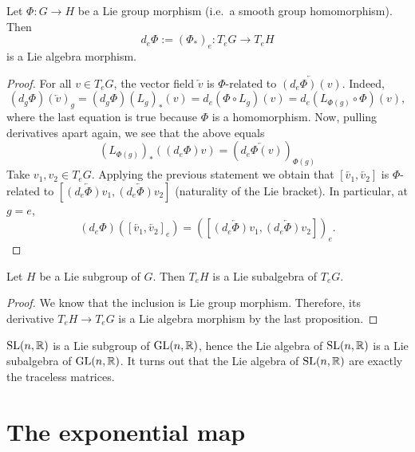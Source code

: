 \begin{prop}[B]\label{prop:B}
    Let $\Phi: G \to H$ be a Lie group morphism (i.e.\ a smooth group homomorphism).
    Then $$ d_e \Phi := (\Phi_*)_e: T_e G \to  T_e H $$ is a Lie algebra morphism.
\end{prop}
\begin{proof}
    For all $v \in T_eG$, the vector field $\overleftarrow v$ is  $\Phi$-related to 
    $\overleftarrow{( d_e \Phi)(v)}$.
    Indeed, 
    \[
        (d_g \Phi)(\overleftarrow v)_g = 
        (d_g \Phi)(L_g)_*(v) = 
        d_e (\Phi  \circ  L_g)(v) = 
        d_e(L_{\Phi(g)}  \circ  \Phi) (v)
    ,\] 
    where the last equation is true because $\Phi$ is a homomorphism.
    Now, pulling derivatives apart again, we see that the above equals
    \[
        (L_{\Phi(g)})_* ((d_e \Phi)v) = (\overleftarrow{d_e \Phi(v)})_{\Phi(g)}
    \] 
Take $v_1, v_2 \in T_e G$.
    Applying the previous statement we obtain that $ [\overleftarrow{v_1}, \overleftarrow{v_2}] $   is $\Phi$-related to $[\overleftarrow{(d_e \Phi)v_1}, \overleftarrow{(d_e \Phi)v_2}]$ (naturality of the Lie bracket).
    In particular, at  $g = e$,
     \[
         ( d_e \Phi)(\left[\overleftarrow{v_1}, \overleftarrow{v_2}\right]_e)
         = \left( \left[\overleftarrow{(d_e \Phi) v_1}, \overleftarrow{(d_e \Phi) v_2}\right] \right)_e
    .\] 
\end{proof}
\begin{prop}[C]
    Let $H$ be a Lie subgroup of $G$.
    Then $T_e H$ is a Lie subalgebra of $T_eG$.
\end{prop}
\begin{proof}
    We know that the inclusion is Lie group morphism.
    Therefore, its derivative $T_e H \to  T_eG$ is a Lie algebra morphism by the last proposition.
\end{proof}
\begin{eg}
$\operatorname{SL}(n, \mathbb{R})$ is a Lie subgroup of $\operatorname{GL}(n, \mathbb{R})$, hence    the Lie algebra of $\operatorname{SL}(n, \mathbb{R})$ is a Lie subalgebra of $\operatorname{GL}(n, \mathbb{R})$.
 It turns out that the Lie algebra of $\operatorname{SL}(n, \mathbb{R})$ are exactly the traceless matrices.
\end{eg}

\section{The exponential map}

